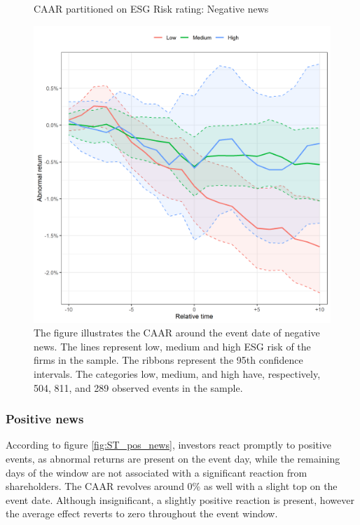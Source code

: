 \begin{figure} [H]
    \centering
    \caption{CAAR partitioned on ESG Risk rating: Negative news }
    \includegraphics[scale=0.6]{Projekt/1.Figures analysis/ST_negative_ESG.png}
     \caption*{\footnotesize The figure illustrates the CAAR around the event date of negative news. The lines represent low, medium and high ESG risk of the firms in the sample. The ribbons represent the 95th confidence intervals. The categories low, medium, and high have, respectively, 504, 811, and 289 observed events in the sample. }
    \label{fig:ST_neg_ESG}
\end{figure} 


\subsubsection{Positive news}

According to figure \ref{fig:ST_pos_news}, investors react promptly to positive events, as abnormal returns are present on the event day, while the remaining days of the window are not associated with a significant reaction from shareholders. The CAAR revolves around 0\% as well with a slight top on the event date. Although insignificant, a slightly positive reaction is present, however the average effect reverts to zero throughout the event window. 

